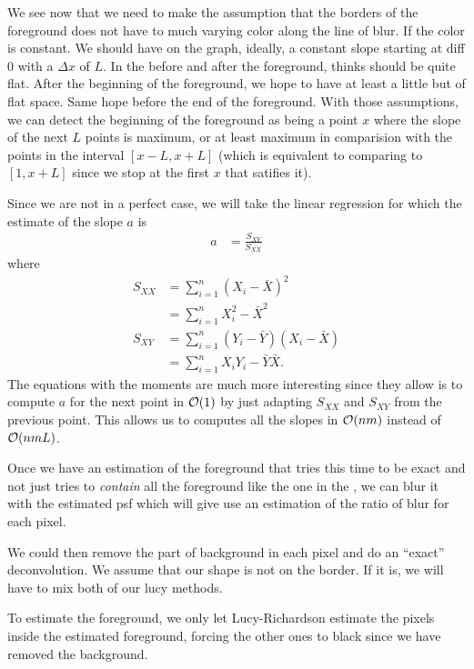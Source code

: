 
We see now that we need to make the assumption that
the borders of the foreground does not have to much varying
color along the line of blur.
If the color is constant.
We should have on the graph, ideally,
a constant slope starting at diff 0 with a $\Delta x$ of $L$.
In the before and after the foreground, thinks should be quite
flat.
After the beginning of the foreground, we hope to have at least
a little but of flat space.
Same hope before the end of the foreground.
With those assumptions,
we can detect the beginning of the foreground as being
a point $x$ where the slope of the next $L$ points is maximum,
or at least maximum in comparision with the points in the interval
$[x-L,x+L]$ (which is equivalent to comparing to $[1,x+L]$ since we stop at the first $x$ that satifies it).

Since we are not in a perfect case, we will take the linear
regression for which the estimate of the slope $a$ is
\begin{align*}
  \hat{a} & = \frac{S_{XY}}{S_{XX}}
\end{align*}
where
\begin{align*}
  S_{XX} & = \sum_{i=1}^n (X_i - \bar{X})^2\\
         & = \sum_{i=1}^n X_i^2 - \bar{X}^2\\
  S_{XY} & = \sum_{i=1}^n (Y_i - \bar{Y})(X_i - \bar{X})\\
         & = \sum_{i=1}^n X_iY_i - \bar{Y}\bar{X}.
\end{align*}
The equations with the moments are much more interesting since
they allow is to compute $a$ for the next point in $\mathcal{O}(1)$
by just adapting $S_{XX}$ and $S_{XY}$ from the previous point.
This allows us to computes all the slopes in $\mathcal{O}(nm)$
instead of $\mathcal{O}(nmL)$.

Once we have an estimation of the foreground that tries this time to be
exact and not just tries to \emph{contain} all the foreground like
the one in the ,
we can blur it with the estimated psf which will give
use an estimation of the ratio of blur for each pixel.

We could then remove the part of background in each pixel
and do an ``exact'' deconvolution.
We assume that our shape is not on the border.
If it is, we will have to mix both of our lucy methods.

To estimate the foreground, we only let Lucy-Richardson
estimate the pixels inside the estimated foreground,
forcing the other ones to black since we have removed the
background.

